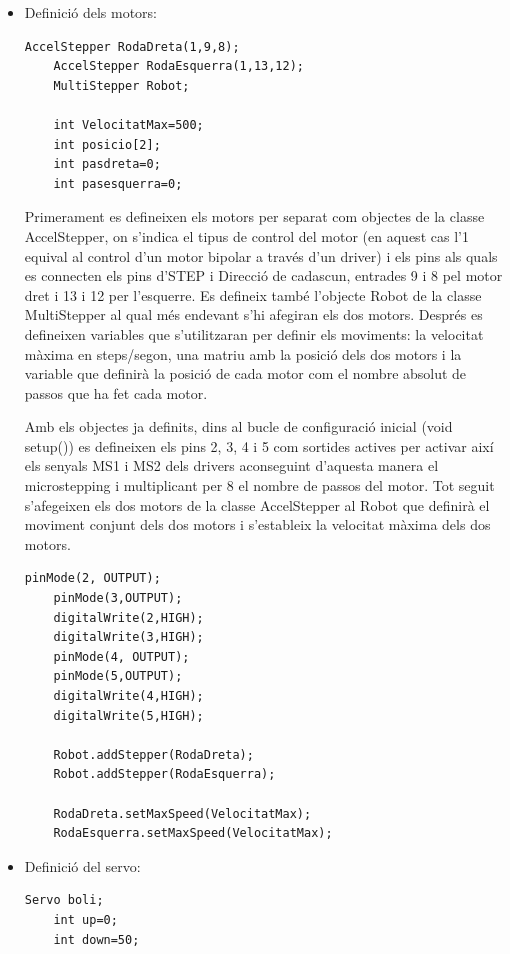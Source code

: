 \begin{itemize}
	\item Definició dels motors: 
	
	\begin{lstlisting}[style=Arduino]
	AccelStepper RodaDreta(1,9,8);
	AccelStepper RodaEsquerra(1,13,12);
	MultiStepper Robot;
	
	int VelocitatMax=500;
	int posicio[2];
	int pasdreta=0; 
	int pasesquerra=0;
	\end{lstlisting}
	
	
	Primerament es defineixen els motors per separat com objectes de la classe AccelStepper, on s’indica el tipus de control del motor (en aquest cas l’1 equival al control d’un motor bipolar a través d’un driver) i els pins als quals es connecten els pins d’STEP i Direcció de cadascun, entrades 9 i 8 pel motor dret i 13 i 12 per l’esquerre. Es defineix també l’objecte Robot de la classe MultiStepper al qual més endevant s’hi afegiran els dos motors. Després es defineixen variables que s’utilitzaran per definir els moviments: la velocitat màxima en steps/segon, una matriu amb la posició dels dos motors i la variable que definirà la posició de cada motor com el nombre absolut de passos que ha fet cada motor. 
	
	Amb els objectes ja definits, dins al bucle de configuració inicial (void setup()) es defineixen els pins 2, 3, 4 i 5 com sortides actives per activar així els senyals MS1 i MS2 dels drivers aconseguint d’aquesta manera el microstepping i multiplicant per 8 el nombre de passos del motor. Tot seguit s’afegeixen els dos motors de la classe AccelStepper al Robot que definirà el moviment conjunt dels dos motors i s’estableix la velocitat màxima dels dos motors. 
	
	\begin{lstlisting}[style=Arduino]
	pinMode(2, OUTPUT); 
	pinMode(3,OUTPUT);
	digitalWrite(2,HIGH);
	digitalWrite(3,HIGH);
	pinMode(4, OUTPUT);
	pinMode(5,OUTPUT);
	digitalWrite(4,HIGH);
	digitalWrite(5,HIGH);
	
	Robot.addStepper(RodaDreta);
	Robot.addStepper(RodaEsquerra);
	
	RodaDreta.setMaxSpeed(VelocitatMax);	
	RodaEsquerra.setMaxSpeed(VelocitatMax);
	\end{lstlisting}	
	\item Definició del servo:
	\begin{lstlisting}[style=Arduino]
	Servo boli;
	int up=0;
	int down=50;
	\end{lstlisting}
	

\end{itemize}
